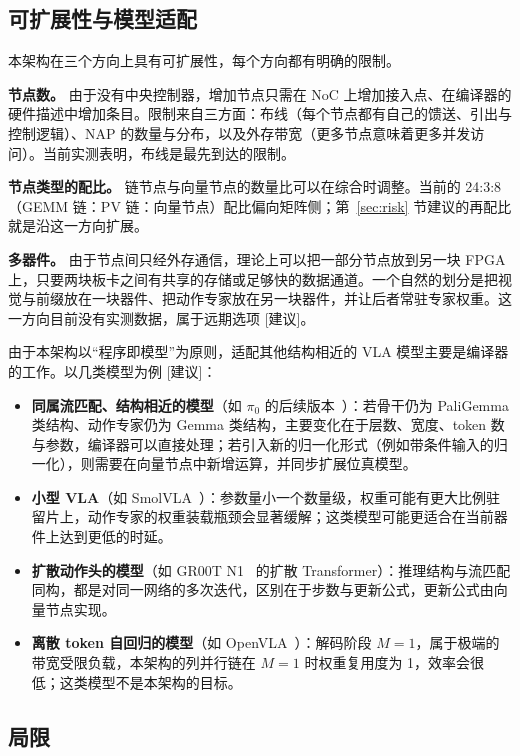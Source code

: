\documentclass[a4paper,10.5pt]{ctexart}
\newcommand{\tR}{\textsf{[建议]}}           %
\newcommand{\pizero}{$\pi_0$}
\begin{document}
\subsection{可扩展性与模型适配}

本架构在三个方向上具有可扩展性，每个方向都有明确的限制。

\textbf{节点数。} 由于没有中央控制器，增加节点只需在 NoC 上增加接入点、在编译器的硬件描述中增加条目。限制来自三方面：布线（每个节点都有自己的馈送、引出与控制逻辑）、NAP 的数量与分布，以及外存带宽（更多节点意味着更多并发访问）。当前实测表明，布线是最先到达的限制。

\textbf{节点类型的配比。} 链节点与向量节点的数量比可以在综合时调整。当前的 24:3:8（GEMM 链：PV 链：向量节点）配比偏向矩阵侧；第~\ref{sec:risk} 节建议的再配比就是沿这一方向扩展。

\textbf{多器件。} 由于节点间只经外存通信，理论上可以把一部分节点放到另一块 FPGA 上，只要两块板卡之间有共享的存储或足够快的数据通道。一个自然的划分是把视觉与前缀放在一块器件、把动作专家放在另一块器件，并让后者常驻专家权重。这一方向目前没有实测数据，属于远期选项 \tR。

由于本架构以“程序即模型”为原则，适配其他结构相近的 VLA 模型主要是编译器的工作。以几类模型为例 \tR：
\begin{itemize}
  \item \textbf{同属流匹配、结构相近的模型}（如 \pizero{} 的后续版本~\cite{pi05}）：若骨干仍为 PaliGemma 类结构、动作专家仍为 Gemma 类结构，主要变化在于层数、宽度、token 数与参数，编译器可以直接处理；若引入新的归一化形式（例如带条件输入的归一化），则需要在向量节点中新增运算，并同步扩展位真模型。
  \item \textbf{小型 VLA}（如 SmolVLA~\cite{smolvla}）：参数量小一个数量级，权重可能有更大比例驻留片上，动作专家的权重装载瓶颈会显著缓解；这类模型可能更适合在当前器件上达到更低的时延。
  \item \textbf{扩散动作头的模型}（如 GR00T N1~\cite{gr00t} 的扩散 Transformer）：推理结构与流匹配同构，都是对同一网络的多次迭代，区别在于步数与更新公式，更新公式由向量节点实现。
  \item \textbf{离散 token 自回归的模型}（如 OpenVLA~\cite{openvla}）：解码阶段 $M=1$，属于极端的带宽受限负载，本架构的列并行链在 $M=1$ 时权重复用度为 1，效率会很低；这类模型不是本架构的目标。
\end{itemize}

\subsection{局限}
\end{document}
